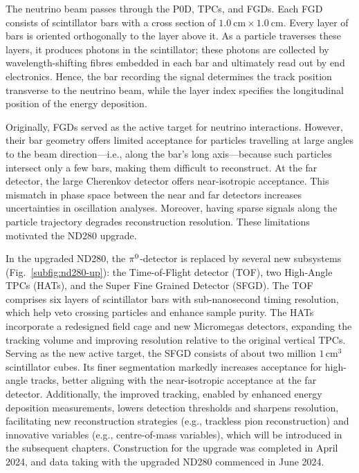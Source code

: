 The neutrino beam passes through the P0D, TPCs, and FGDs.  
Each FGD consists of scintillator bars with a cross section of \(1.0~\mathrm{cm} \times 1.0~\mathrm{cm}\).  
Every layer of bars is oriented orthogonally to the layer above it.  
As a particle traverses these layers, it produces photons in the scintillator; these photons are collected by wavelength-shifting fibres embedded in each bar and ultimately read out by end electronics.  
Hence, the bar recording the signal determines the track position transverse to the neutrino beam, while the layer index specifies the longitudinal position of the energy deposition.

Originally, FGDs served as the active target for neutrino interactions.  
However, their bar geometry offers limited acceptance for particles travelling at large angles to the beam direction—i.e., along the bar’s long axis—because such particles intersect only a few bars, making them difficult to reconstruct.  
At the far detector, the large Cherenkov detector offers near-isotropic acceptance.
This mismatch in phase space between the near and far detectors increases uncertainties in oscillation analyses.  
Moreover, having sparse signals along the particle trajectory degrades reconstruction resolution.  
These limitations motivated the ND280 upgrade.

In the upgraded ND280, the \(\pi^0\)-detector is replaced by several new subsystems (Fig.~\ref{subfig:nd280-up}): the Time-of-Flight detector (TOF), two High-Angle TPCs (HATs), and the Super Fine Grained Detector (SFGD).  
The TOF comprises six layers of scintillator bars with sub-nanosecond timing resolution, which help veto crossing particles and enhance sample purity.  
The HATs incorporate a redesigned field cage and new Micromegas detectors, expanding the tracking volume and improving resolution relative to the original vertical TPCs.  
Serving as the new active target, the SFGD consists of about two million \(1\,\mathrm{cm}^3\) scintillator cubes.  
Its finer segmentation markedly increases acceptance for high-angle tracks, better aligning with the near-isotropic acceptance at the far detector.  
Additionally, the improved tracking, enabled by enhanced energy deposition measurements, lowers detection thresholds and sharpens resolution, facilitating new reconstruction strategies (e.g., trackless pion reconstruction) and innovative variables (e.g., centre-of-mass variables), which will be introduced in the subsequent chapters.  
Construction for the upgrade was completed in April 2024, and data taking with the upgraded ND280 commenced in June 2024.

